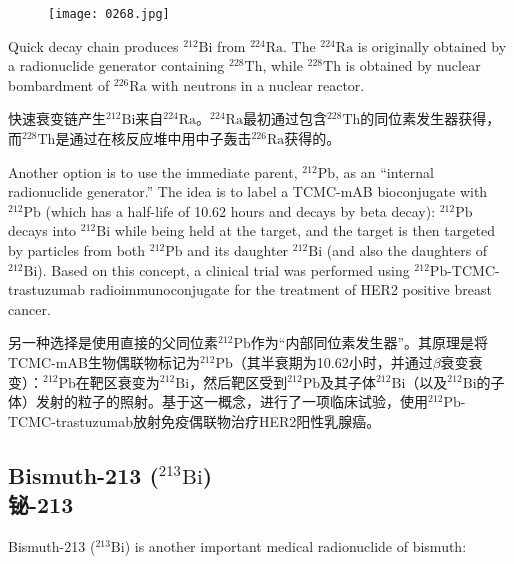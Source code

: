 \documentclass[dvipsnames, svgnames,a4paper,11pt]{article}
\begin{document}
\begin{figure}[h]
	\centering
    \texttt{[image: 0268.jpg]}  
     \label{fig358}
\end{figure}


Quick decay chain produces \(\mathrm{^{212}Bi}\) from \(\mathrm{^{224}Ra}\). The \(\mathrm{^{224}Ra}\) is originally obtained by a radionuclide generator containing \(\mathrm{^{228}Th}\), while \(\mathrm{^{228}Th}\) is obtained by nuclear bombardment of \(\mathrm{^{226}Ra}\) with neutrons in a nuclear reactor.  

快速衰变链产生\(\mathrm{^{212}Bi}\)来自\(\mathrm{^{224}Ra}\)。\(\mathrm{^{224}Ra}\)最初通过包含\(\mathrm{^{228}Th}\)的同位素发生器获得，而\(\mathrm{^{228}Th}\)是通过在核反应堆中用中子轰击\(\mathrm{^{226}Ra}\)获得的。  

Another option is to use the immediate parent, \(\mathrm{^{212}Pb}\), as an “internal radionuclide generator.” The idea is to label a TCMC-mAB bioconjugate with \(\mathrm{^{212}Pb}\) (which has a half-life of 10.62 hours and decays by beta decay): \(\mathrm{^{212}Pb}\) decays into \(\mathrm{^{212}Bi}\) while being held at the target, and the target is then targeted by particles from both \(\mathrm{^{212}Pb}\) and its daughter \(\mathrm{^{212}Bi}\) (and also the daughters of \(\mathrm{^{212}Bi}\)). Based on this concept, a clinical trial was performed using \(\mathrm{^{212}Pb}\)-TCMC-trastuzumab radioimmunoconjugate for the treatment of HER2 positive breast cancer.

另一种选择是使用直接的父同位素\(\mathrm{^{212}Pb}\)作为“内部同位素发生器”。其原理是将TCMC-mAB生物偶联物标记为\(\mathrm{^{212}Pb}\)（其半衰期为10.62小时，并通过$\beta$衰变衰变）：\(\mathrm{^{212}Pb}\)在靶区衰变为\(\mathrm{^{212}Bi}\)，然后靶区受到\(\mathrm{^{212}Pb}\)及其子体\(\mathrm{^{212}Bi}\)（以及\(\mathrm{^{212}Bi}\)的子体）发射的粒子的照射。基于这一概念，进行了一项临床试验，使用\(\mathrm{^{212}Pb}\)-TCMC-trastuzumab放射免疫偶联物治疗HER2阳性乳腺癌。


\subsection{Bismuth-213 (\(\mathrm{^{213}Bi}\)) \\铋-213}  
Bismuth-213 (\(\mathrm{^{213}Bi}\)) is another important medical radionuclide of bismuth:
\end{document}
